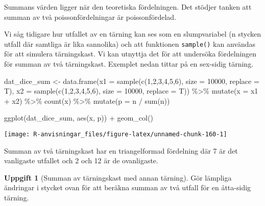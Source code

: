 \documentclass[
]{book}
\newenvironment{Shaded}{\begin{snugshade}}{\end{snugshade}}
\newcommand{\AttributeTok}[1]{\textcolor[rgb]{0.77,0.63,0.00}{#1}}
\newcommand{\DecValTok}[1]{\textcolor[rgb]{0.00,0.00,0.81}{#1}}
\newcommand{\FunctionTok}[1]{\textcolor[rgb]{0.00,0.00,0.00}{#1}}
\newcommand{\NormalTok}[1]{#1}
\newcommand{\OtherTok}[1]{\textcolor[rgb]{0.56,0.35,0.01}{#1}}
\newcommand{\SpecialCharTok}[1]{\textcolor[rgb]{0.00,0.00,0.00}{#1}}
\theoremstyle{definition}
\theoremstyle{definition}
\theoremstyle{definition}
\newtheorem{exercise}{Uppgift}[chapter]
\theoremstyle{definition}
\theoremstyle{remark}
\begin{document}
Summans värden ligger när den teoretiska fördelningen. Det stödjer tanken att summan av två poissonfördelningar är poissonfördelad.

Vi såg tidigare hur utfallet av en tärning kan ses som en slumpvariabel (n stycken utfall där samtliga är lika sannolika) och att funktionen \texttt{sample()} kan användas för att simulera tärningskast. Vi kan utnyttja det för att undersöka fördelningen för summan av två tärningskast. Exemplet nedan tittar på en sex-sidig tärning.

\begin{Shaded}
\begin{Highlighting}[]
\NormalTok{dat\_dice\_sum }\OtherTok{\textless{}{-}} \FunctionTok{data.frame}\NormalTok{(}\AttributeTok{x1 =} \FunctionTok{sample}\NormalTok{(}\FunctionTok{c}\NormalTok{(}\DecValTok{1}\NormalTok{,}\DecValTok{2}\NormalTok{,}\DecValTok{3}\NormalTok{,}\DecValTok{4}\NormalTok{,}\DecValTok{5}\NormalTok{,}\DecValTok{6}\NormalTok{), }\AttributeTok{size =} \DecValTok{10000}\NormalTok{, }\AttributeTok{replace =}\NormalTok{ T),}
                           \AttributeTok{x2 =} \FunctionTok{sample}\NormalTok{(}\FunctionTok{c}\NormalTok{(}\DecValTok{1}\NormalTok{,}\DecValTok{2}\NormalTok{,}\DecValTok{3}\NormalTok{,}\DecValTok{4}\NormalTok{,}\DecValTok{5}\NormalTok{,}\DecValTok{6}\NormalTok{), }\AttributeTok{size =} \DecValTok{10000}\NormalTok{, }\AttributeTok{replace =}\NormalTok{ T)) }\SpecialCharTok{\%\textgreater{}\%} 
  \FunctionTok{mutate}\NormalTok{(}\AttributeTok{x =}\NormalTok{ x1 }\SpecialCharTok{+}\NormalTok{ x2) }\SpecialCharTok{\%\textgreater{}\%} 
  \FunctionTok{count}\NormalTok{(x) }\SpecialCharTok{\%\textgreater{}\%} 
  \FunctionTok{mutate}\NormalTok{(}\AttributeTok{p =}\NormalTok{ n }\SpecialCharTok{/} \FunctionTok{sum}\NormalTok{(n))}

\FunctionTok{ggplot}\NormalTok{(dat\_dice\_sum, }\FunctionTok{aes}\NormalTok{(x, p)) }\SpecialCharTok{+}
  \FunctionTok{geom\_col}\NormalTok{()}
\end{Highlighting}
\end{Shaded}

\begin{center}\texttt{[image: R-anvisningar\_files/figure-latex/unnamed-chunk-160-1]} \end{center}

Summan av två tärningskast har en triangelformad fördelning där 7 är det vanligaste utfallet och 2 och 12 är de ovanligaste.

\begin{exercise}[Summan av tärningskast med annan tärning]
Gör lämpliga ändringar i stycket ovan för att beräkna summan av två utfall för en åtta-sidig tärning.
\end{exercise}
\end{document}
